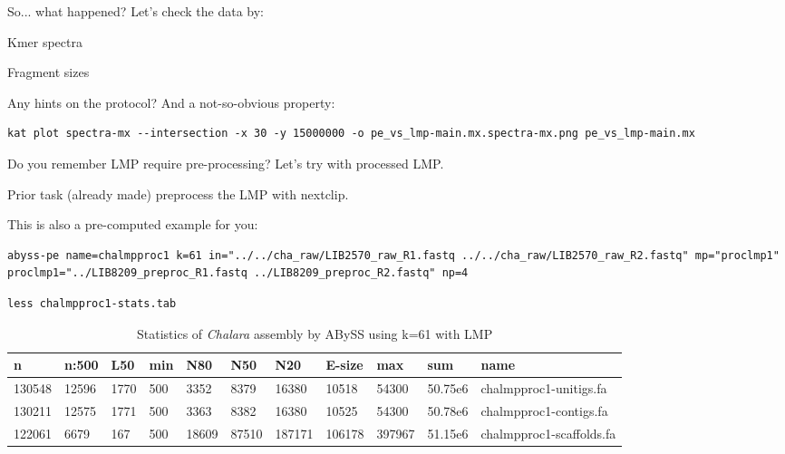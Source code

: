 \begin{information}
So... what happened?
Let's check the data by:
\item Kmer spectra
\item Fragment sizes
\item Any hints on the protocol?
And a not-so-obvious property:
\end{information}
\begin{steps}
\begin{lstlisting}
kat plot spectra-mx --intersection -x 30 -y 15000000 -o pe_vs_lmp-main.mx.spectra-mx.png pe_vs_lmp-main.mx

\end{lstlisting}
\end{steps}

\begin{information}
Do you remember LMP require pre-processing?  Let's try with processed LMP.
\end{information}

\begin{steps}
Prior task (already made) preprocess the LMP with nextclip.

\begin{warning}
This is also a pre-computed example for you:
\begin{lstlisting}
abyss-pe name=chalmpproc1 k=61 in="../../cha_raw/LIB2570_raw_R1.fastq ../../cha_raw/LIB2570_raw_R2.fastq" mp="proclmp1" proclmp1="../LIB8209_preproc_R1.fastq ../LIB8209_preproc_R2.fastq" np=4
\end{lstlisting}
\end{warning}
\begin{lstlisting}
less chalmpproc1-stats.tab
\end{lstlisting}
\end{steps}

\begin{table}[H]
\small
  \centering
  \caption{Statistics of \textit{Chalara} assembly by ABySS using k=61 with LMP}
    \begin{tabular}{lllllllllll}
    \toprule
    \textbf{n} & \textbf{n:500} & \textbf{L50} & \textbf{min} & \textbf{N80}& \textbf{N50}& \textbf{N20}& \textbf{E-size}& \textbf{max} & \textbf{sum}& \textbf{name}\\
    \midrule
    130548  & 12596  & 1770  & 500  & 3352   & 8379   & 16380   & 10518   & 54300   & 50.75e6  & chalmpproc1-unitigs.fa \\
    130211  & 12575  & 1771  & 500  & 3363   & 8382   & 16380   & 10525   & 54300   & 50.78e6  & chalmpproc1-contigs.fa \\
    122061  & 6679   & 167   & 500  & 18609  & 87510  & 187171  & 106178  & 397967  & 51.15e6  & chalmpproc1-scaffolds.fa \\
    \bottomrule
    \end{tabular}
  \label{tab:chaklmpk61}
\end{table}

